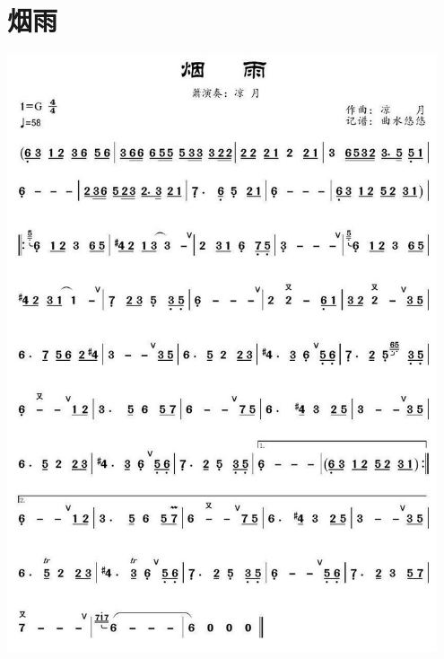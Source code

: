 \documentclass[cn,pad,twocol]{elegantbook}
\begin{document}
\section{烟雨}
    \includegraphics[width=0.95\textwidth]{dongxiao/20200909-烟雨.jpg}
\end{document}
